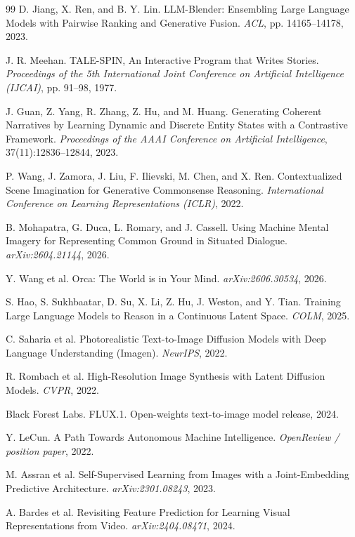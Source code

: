 \documentclass[11pt,a4paper]{article}
\begin{document}
\begin{thebibliography}{99}
 D. Jiang, X. Ren, and B. Y. Lin. LLM-Blender: Ensembling Large Language Models with Pairwise Ranking and Generative Fusion. \emph{ACL}, pp. 14165--14178, 2023.

 J. R. Meehan. TALE-SPIN, An Interactive Program that Writes Stories. \emph{Proceedings of the 5th International Joint Conference on Artificial Intelligence (IJCAI)}, pp. 91--98, 1977.

 J. Guan, Z. Yang, R. Zhang, Z. Hu, and M. Huang. Generating Coherent Narratives by Learning Dynamic and Discrete Entity States with a Contrastive Framework. \emph{Proceedings of the AAAI Conference on Artificial Intelligence}, 37(11):12836--12844, 2023.

 P. Wang, J. Zamora, J. Liu, F. Ilievski, M. Chen, and X. Ren. Contextualized Scene Imagination for Generative Commonsense Reasoning. \emph{International Conference on Learning Representations (ICLR)}, 2022.

 B. Mohapatra, G. Duca, L. Romary, and J. Cassell. Using Machine Mental Imagery for Representing Common Ground in Situated Dialogue. \emph{arXiv:2604.21144}, 2026.

 Y. Wang et al. Orca: The World is in Your Mind. \emph{arXiv:2606.30534}, 2026.

 S. Hao, S. Sukhbaatar, D. Su, X. Li, Z. Hu, J. Weston, and Y. Tian. Training Large Language Models to Reason in a Continuous Latent Space. \emph{COLM}, 2025.

 C. Saharia et al. Photorealistic Text-to-Image Diffusion Models with Deep Language Understanding (Imagen). \emph{NeurIPS}, 2022.

 R. Rombach et al. High-Resolution Image Synthesis with Latent Diffusion Models. \emph{CVPR}, 2022.

 Black Forest Labs. FLUX.1. Open-weights text-to-image model release, 2024.

 Y. LeCun. A Path Towards Autonomous Machine Intelligence. \emph{OpenReview / position paper}, 2022.

 M. Assran et al. Self-Supervised Learning from Images with a Joint-Embedding Predictive Architecture. \emph{arXiv:2301.08243}, 2023.

 A. Bardes et al. Revisiting Feature Prediction for Learning Visual Representations from Video. \emph{arXiv:2404.08471}, 2024.


\end{thebibliography}
\end{document}

